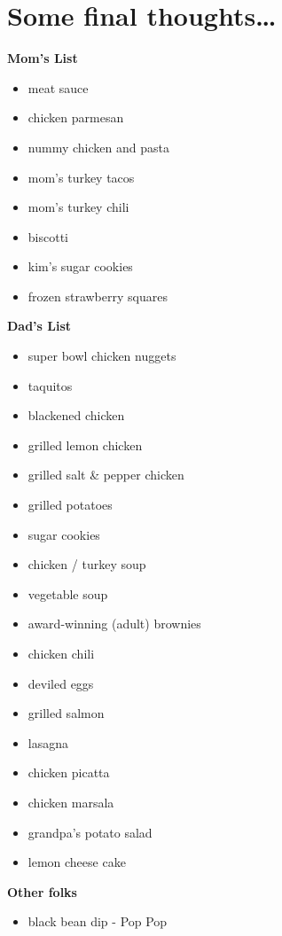 
\chapter{Some final thoughts\dots}


\textbf{Mom's List}

\begin{itemize}
    \itemsep0em

    \item meat sauce
    \item chicken parmesan
    \item nummy chicken and pasta
    \item mom's turkey tacos
    \item mom's turkey chili
    \item biscotti
    \item kim's sugar cookies
    \item frozen strawberry squares
\end{itemize}

\textbf{Dad's List}

\begin{itemize}
    \itemsep0em

    \item super bowl chicken nuggets
    \item taquitos
    \item blackened chicken
    \item grilled lemon chicken
    \item grilled salt \& pepper chicken
    \item grilled potatoes
    \item sugar cookies
    \item chicken / turkey soup
    \item vegetable soup
    \item award-winning (adult) brownies
    \item chicken chili
    \item deviled eggs
    \item grilled salmon
    \item lasagna
    \item chicken picatta
    \item chicken marsala
    \item grandpa's potato salad
    \item lemon cheese cake
\end{itemize}

\textbf{Other folks}

\begin{itemize}
    \itemsep0em

    \item black bean dip - Pop Pop
\end{itemize}